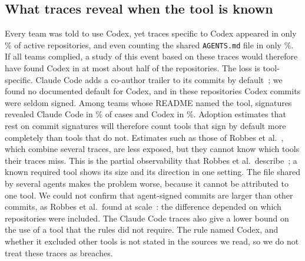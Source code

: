 \documentclass{article}
\begin{document}
\subsection{What traces reveal when the tool is known}
Every team was told to use Codex, yet traces specific to Codex appeared in only \NRqTwoTracesCodexSpecificPct\% of active repositories, and even counting the shared \texttt{AGENTS.md} file in only \NRqTwoTracesCodexAnyPct\%. If all teams complied, a study of this event based on these traces would therefore have found Codex in at most about half of the repositories. The loss is tool-specific. Claude Code adds a co-author trailer to its commits by default~\cite{claudecode2026attribution}; we found no documented default for Codex, and in these repositories Codex commits were seldom signed. Among teams whose README named the tool, signatures revealed Claude Code in \NRqTwoTracesSelfReportClaudeStrictSignatureGivenMentionPct\% of cases and Codex in \NRqTwoTracesSelfReportCodexStrictSignatureGivenMentionPct\%. Adoption estimates that rest on commit signatures will therefore count tools that sign by default more completely than tools that do not. Estimates such as those of Robbes et al.~\cite{robbes2026agenticmuch}, which combine several traces, are less exposed, but they cannot know which tools their traces miss. This is the partial observability that Robbes et al.\ describe~\cite{robbes2026heuristics}; a known required tool shows its size and its direction in one setting. The file shared by several agents makes the problem worse, because it cannot be attributed to one tool. We could not confirm that agent-signed commits are larger than other commits, as Robbes et al.\ found at scale~\cite{robbes2026agenticmuch}: the difference depended on which repositories were included. The Claude Code traces also give a lower bound on the use of a tool that the rules did not require. The rule named Codex, and whether it excluded other tools is not stated in the sources we read, so we do not treat these traces as breaches.
\end{document}
